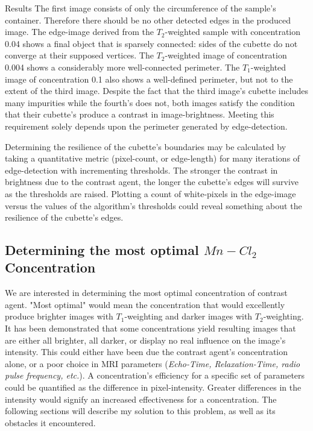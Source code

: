 \documentclass[a4paper,12pt]{article}
\begin{document}
\begin{section}{Results}
The first image consists of only the circumference of the sample's container. Therefore there should be no other detected edges in the produced image. The edge-image derived from the $T_2$-weighted sample with concentration 0.04 shows a final object that is sparsely connected: sides of the cubette do not converge at their supposed vertices. The $T_2$-weighted image of concentration 0.004 shows a considerably more well-connected perimeter. The $T_1$-weighted image of concentration 0.1 also shows a well-defined perimeter, but not to the extent of the third image. Despite the fact that the third image's cubette includes many impurities while the fourth's does not, both images satisfy the condition that their cubette's produce a contrast in image-brightness. Meeting this requirement solely depends upon the perimeter generated by edge-detection.

Determining the resilience of the cubette's boundaries may be calculated by taking a quantitative metric (pixel-count, or edge-length) for many iterations of edge-detection with incrementing thresholds. The stronger the contrast in brightness due to the contrast agent, the longer the cubette's edges will survive as the thresholds are raised. Plotting a count of white-pixels in the edge-image versus the values of the algorithm's thresholds could reveal something about the resilience of the cubette's edges. 

\subsection{Determining the most optimal $Mn-Cl_2$ Concentration}

We are interested in determining the most optimal concentration of contrast agent. "Most optimal" would mean the concentration that would excellently produce brighter images with $T_1$-weighting and darker images with $T_2$-weighting. It has been demonstrated that some concentrations yield resulting images that are either all brighter, all darker, or display no real influence on the image's intensity. This could either have been due the contrast agent's concentration alone, or a poor choice in MRI parameters ({\em Echo-Time, Relaxation-Time, radio pulse frequency, etc.}). A concentration's efficiency for a specific set of parameters could be quantified as the difference in pixel-intensity. Greater differences in the intensity would signify an increased effectiveness for a concentration. The following sections will describe my solution to this problem, as well as its obstacles it encountered.


\end{section}
\end{document}
